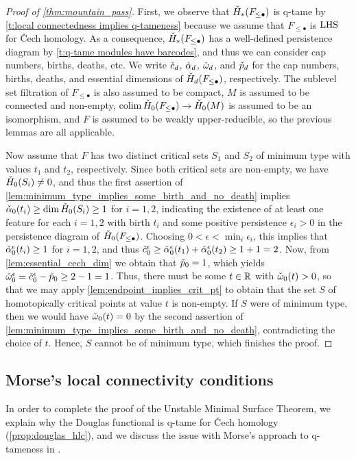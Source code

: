\begin{proof}[Proof of \cref{thm:mountain_pass}]
    First, we observe that $\check{H}_*(F_{\leq \bullet})$ is q-tame by \cref{t:local connectedness implies q-tameness} because we assume that $F_{\leq \bullet}$ is $\mathrm{LHS}$ for \v{C}ech homology.
    As a consequence, $\check{H}_*(F_{\leq \bullet})$ has a well-defined persistence diagram by \cref{t:q-tame modules have barcodes}, and thus we can consider cap numbers, births, deaths, etc.
    We write $\check{c}_d$, $\check{\alpha}_d$, $\check{\omega}_d$, and $\check{p}_d$ for the cap numbers, births, deaths, and essential dimensions of $\check{H}_d(F_{\leq \bullet})$, respectively.
    The sublevel set filtration of $F_{\leq \bullet}$ is also assumed to be compact, $M$ is assumed to be connected and non-empty, $\operatorname*{colim} \check{H}_0(F_{\leq \bullet}) \to \check{H}_0(M)$ is assumed to be an isomorphism, and $F$ is assumed to be weakly upper-reducible, so the previous lemmas are all applicable.
	
	Now assume that $F$ has two distinct critical sets $S_{1}$ and $S_{2}$ of minimum type with values $t_{1}$ and $t_{2}$, respectively.
	Since both critical sets are non-empty, we have $\check{H}_{0}(S_{i}) \neq 0$, and thus the first assertion of \cref{lem:minimum_type_implies_some_birth_and_no_death} implies $\check{\alpha}_{0}(t_{i}) \geq \dim \check{H}_0(S_{i}) \geq 1$ for $i = 1,2$,
	indicating the existence of at least one feature for each $i = 1,2$ with birth $t_{i}$ and some positive persistence $\epsilon_i > 0$ in the persistence diagram of $\check{H}_0(F_{\leq \bullet})$.
	Choosing $0 < \epsilon < \min_i \epsilon_i$, this implies that
	$\check{\alpha}_{0}^{\epsilon}(t_{i}) \geq 1$ for $i = 1,2$,
	and thus
	$\check{c}_{0}^{\epsilon} \geq \check{\alpha}_{0}^{\epsilon}(t_{1}) + \check{\alpha}_{0}^{\epsilon}(t_{2}) \geq 1 + 1 = 2$.
	Now, from \cref{lem:essential_cech_dim} we obtain that $\check{p}_{0} = 1$, which yields $\check{\omega}_{0}^{\epsilon} = \check{c}_{0}^{\epsilon} - \check{p}_{0} \geq 2 - 1 = 1$.
	Thus, there must be some $t \in \mathbb{R}$ with $\check{\omega}_{0}(t) > 0$, so that we may apply \cref{lem:endpoint_implies_crit_pt} to obtain that the set $S$ of homotopically critical points at value $t$ is non-empty.
	If $S$ were of minimum type, then we would have $\check{\omega}_{0}(t) = 0$ by the second assertion of \cref{lem:minimum_type_implies_some_birth_and_no_death}, contradicting the choice of $t$.
	Hence, $S$ cannot be of minimum type, which finishes the proof.
\end{proof}

\subsection{Morse's local connectivity conditions}\label{subsec:historic_hlc}
In order to complete the proof of the Unstable Minimal Surface Theorem, we explain why the Douglas functional is q-tame for \v{C}ech homology (\cref{prop:douglas_hlc}), and we discuss the issue with Morse's approach to q-tameness in \cite[Theorem 6.3]{Morse.1940}.

